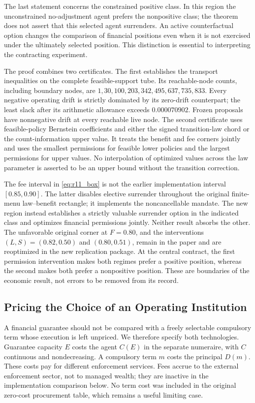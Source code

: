 The last statement concerns the constrained positive class. In this region the unconstrained no-adjustment agent prefers the nonpositive class; the theorem does not assert that this selected agent surrenders. An active counterfactual option changes the comparison of financial positions even when it is not exercised under the ultimately selected position. This distinction is essential to interpreting the contracting experiment.

The proof combines two certificates. The first establishes the transport inequalities on the complete feasible-support tube. Its reachable-node counts, including boundary nodes, are
$1,30,100,203,342,495,637,735,833$. Every negative operating drift is strictly dominated by its zero-drift counterpart; the least slack after its arithmetic allowance exceeds $0.000070902$. Frozen proposals have nonnegative drift at every reachable live node. The second certificate uses feasible-policy Bernstein coefficients and either the signed transition-law chord or the count-information upper value. It treats the benefit and fee corners jointly and uses the smallest permissions for feasible lower policies and the largest permissions for upper values. No interpolation of optimized values across the law parameter is asserted to be an upper bound without the transition correction.

The fee interval in \eqref{eq:r11_box} is not the earlier implementation interval $[0.85,0.90]$. The latter disables elective surrender throughout the original finite-menu law--benefit rectangle; it implements the noncancellable mandate. The new region instead establishes a strictly valuable surrender option in the indicated class and optimizes financial permissions jointly. Neither result absorbs the other. The unfavorable original corner at $F=0.80$, and the interventions $(L,S)=(0.82,0.50)$ and $(0.80,0.51)$, remain in the paper and are reoptimized in the new replication package. At the central contract, the first permission intervention makes both regimes prefer a positive position, whereas the second makes both prefer a nonpositive position. These are boundaries of the economic result, not errors to be removed from its record.

\subsection{Pricing the Choice of an Operating Institution}
\label{subsec:r11_institutions}
A financial guarantee should not be compared with a freely selectable compulsory term whose execution is left unpriced. We therefore specify both technologies. Guarantee capacity $E$ costs the agent $C(E)$ in the separate numeraire, with $C$ continuous and nondecreasing. A compulsory term $m$ costs the principal $D(m)$. These costs pay for different enforcement services. Fees accrue to the external enforcement sector, not to managed wealth; they are inactive in the implementation comparison below. No term cost was included in the original zero-cost procurement table, which remains a useful limiting case.

